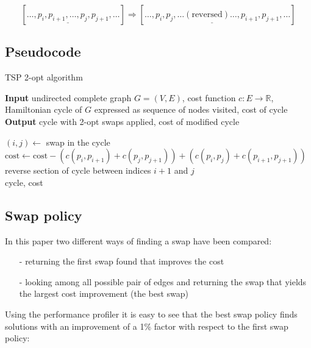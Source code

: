 $$[\ldots,p_i,\underline{p_{i+1},\ldots,p_j},p_{j+1},\ldots]\Rightarrow[\ldots,p_i,\underline{p_j,\ldots(\mbox{reversed})\ldots,p_{i+1}},p_{j+1},\ldots]$$

\subsection{Pseudocode}
\begin{algorithm}
    \caption{TSP 2-opt algorithm}
    \hspace*{\algorithmicindent} \textbf{Input} undirected complete graph $G=(V,E)$, cost function $c:E\rightarrow\mathbb{R}$, Hamiltonian cycle of $G$ expressed as sequence of nodes visited, cost of cycle\\
    \hspace*{\algorithmicindent} \textbf{Output} cycle with 2-opt swaps applied, cost of modified cycle\\
    \begin{algorithmic}

            \State $(i, j)\gets$ swap in the cycle
            \State $\mbox{cost}\gets\mbox{cost}-(c(p_i,p_{i+1})+c(p_j,p_{j+1}))+(c(p_i,p_{j})+c(p_{i+1},p_{j+1}))$
            \State reverse section of cycle between indices $i+1$ and $j$
        \EndWhile\\

        \Return cycle, cost

    \end{algorithmic}
\end{algorithm}

\subsection{Swap policy}

In this paper two different ways of finding a swap have been compared:

\begin{enumerate}
    \item[-] returning the first swap found that improves the cost
    \item[-] looking among all possible pair of edges and returning the swap that yields the largest cost improvement (the best swap)
\end{enumerate}

Using the performance profiler it is easy to see that the best swap policy finds solutions with an improvement of a 1\% factor with respect to the first swap policy:

